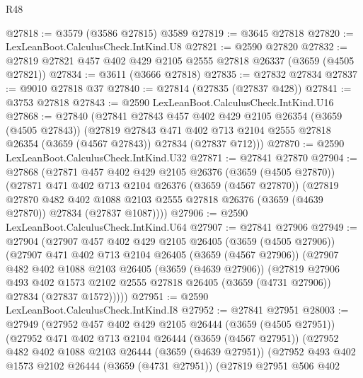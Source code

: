 \begin{lexlean}{R48}
\begin{coremodule}
@27818 := @3579 (@3586 @27815) @3589
@27819 := @3645 @27818
@27820 := LexLeanBoot.CalculusCheck.IntKind.U8
@27821 := @2590 @27820
@27832 := @27819 @27821 @457 @402 @429 @2105 @2555 @27818 @26337 (@3659 (@4505 @27821))
@27834 := @3611 (@3666 @27818)
@27835 := @27832 @27834
@27837 := @9010 @27818 @37
@27840 := @27814 (@27835 (@27837 @428))
@27841 := @3753 @27818
@27843 := @2590 LexLeanBoot.CalculusCheck.IntKind.U16
@27868 := @27840
    (@27841
      @27843
      @457
      @402
      @429
      @2105
      @26354
      (@3659 (@4505 @27843))
      (@27819
        @27843
        @471
        @402
        @713
        @2104
        @2555
        @27818
        @26354
        (@3659 (@4567 @27843))
        @27834
        (@27837 @712)))
@27870 := @2590 LexLeanBoot.CalculusCheck.IntKind.U32
@27871 := @27841 @27870
@27904 := @27868
    (@27871
      @457
      @402
      @429
      @2105
      @26376
      (@3659 (@4505 @27870))
      (@27871
        @471
        @402
        @713
        @2104
        @26376
        (@3659 (@4567 @27870))
        (@27819
          @27870
          @482
          @402
          @1088
          @2103
          @2555
          @27818
          @26376
          (@3659 (@4639 @27870))
          @27834
          (@27837 @1087))))
@27906 := @2590 LexLeanBoot.CalculusCheck.IntKind.U64
@27907 := @27841 @27906
@27949 := @27904
    (@27907
      @457
      @402
      @429
      @2105
      @26405
      (@3659 (@4505 @27906))
      (@27907
        @471
        @402
        @713
        @2104
        @26405
        (@3659 (@4567 @27906))
        (@27907
          @482
          @402
          @1088
          @2103
          @26405
          (@3659 (@4639 @27906))
          (@27819
            @27906
            @493
            @402
            @1573
            @2102
            @2555
            @27818
            @26405
            (@3659 (@4731 @27906))
            @27834
            (@27837 @1572)))))
@27951 := @2590 LexLeanBoot.CalculusCheck.IntKind.I8
@27952 := @27841 @27951
@28003 := @27949
    (@27952
      @457
      @402
      @429
      @2105
      @26444
      (@3659 (@4505 @27951))
      (@27952
        @471
        @402
        @713
        @2104
        @26444
        (@3659 (@4567 @27951))
        (@27952
          @482
          @402
          @1088
          @2103
          @26444
          (@3659 (@4639 @27951))
          (@27952
            @493
            @402
            @1573
            @2102
            @26444
            (@3659 (@4731 @27951))
            (@27819
              @27951
              @506
              @402

\end{coremodule}
\end{lexlean}
